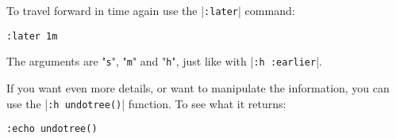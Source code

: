 To travel forward in time again use the |\verb!:later!| command:

\begin{Verbatim}[samepage=true]
 :later 1m
\end{Verbatim}

The arguments are "\verb!s!", "\verb!m!" and "\verb!h!", just like with |\verb!:h :earlier!|.

If you want even more details, or want to manipulate the information, you can use the |\verb!:h undotree()!| function.
To see what it returns:

\begin{Verbatim}[samepage=true]
 :echo undotree()
\end{Verbatim}
\clearpage
